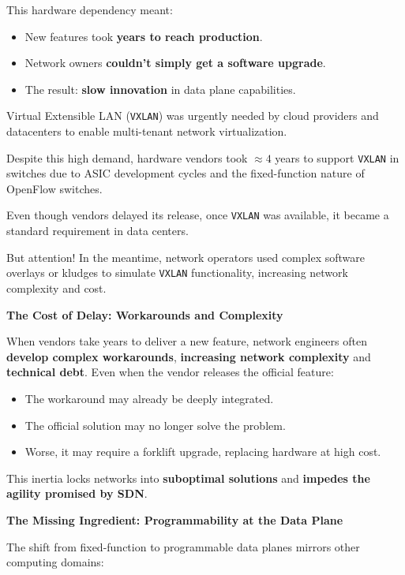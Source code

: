\highspace
This hardware dependency meant:
\begin{itemize}[label=\textcolor{Red2}{}]
    \item New features took \textbf{years to reach production}.
    \item Network owners \textbf{couldn't simply get a software upgrade}.
    \item The result: \textbf{slow innovation} in data plane capabilities.
\end{itemize}

\newpage
\begin{examplebox}
    Virtual Extensible LAN (\texttt{VXLAN}) was urgently needed by cloud providers and datacenters to enable multi-tenant network virtualization.
    
    Despite this high demand, hardware vendors took $\approx 4$ years to support \texttt{VXLAN} in switches due to ASIC development cycles and the fixed-function nature of OpenFlow switches.
    
    Even though vendors delayed its release, once \texttt{VXLAN} was available, it became a standard requirement in data centers.

    But attention! In the meantime, network operators used complex software overlays or kludges to simulate \texttt{VXLAN} functionality, increasing network complexity and cost.
\end{examplebox}

\highspace
\begin{flushleft}
    \textcolor{Red2}{ \textbf{The Cost of Delay: Workarounds and Complexity}}
\end{flushleft}
When vendors take years to deliver a new feature, network engineers often \textbf{develop complex workarounds}, \textbf{increasing network complexity} and \textbf{technical debt}. Even when the vendor releases the official feature:
\begin{itemize}
    \item The workaround may already be deeply integrated.
    \item The official solution may no longer solve the problem.
    \item Worse, it may require a forklift upgrade, replacing hardware at high cost.
\end{itemize}
This inertia locks networks into \textbf{suboptimal solutions} and \textbf{impedes the agility promised by SDN}.

\highspace
\begin{flushleft}
    \textcolor{Green3}{\faIcon{\speedIcon} \textbf{The Missing Ingredient: Programmability at the Data Plane}}
\end{flushleft}
The shift from fixed-function to programmable data planes mirrors other computing domains:

